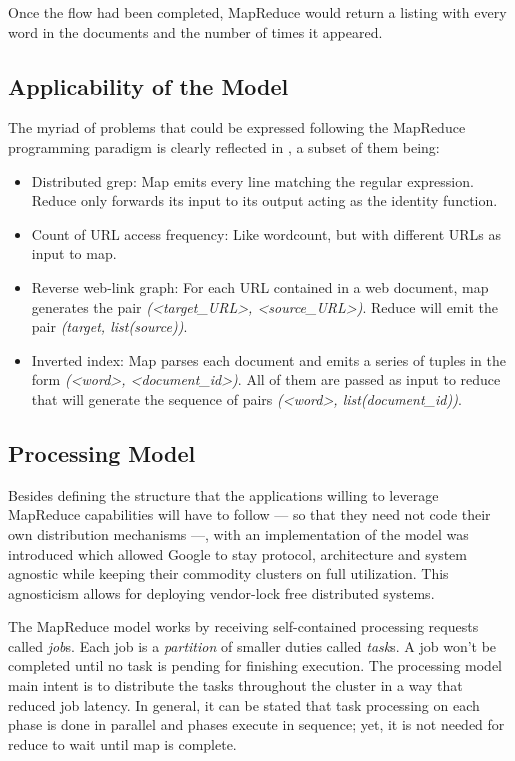 Once the flow had been completed, MapReduce would return a listing with every word in the documents and the number of times it appeared.

\subsection{Applicability of the Model}\label{subsec:aplicabilidad}
\noindent The myriad of problems that could be expressed following the MapReduce programming paradigm is clearly reflected in \cite{googlemapreduce}, a subset of them being:

\begin{itemize}
 \item Distributed grep: Map emits every line matching the regular expression. Reduce only forwards its input to its output acting as the identity function.
 \item Count of URL access frequency: Like wordcount, but with different URLs as input to map.
 \item Reverse web-link graph: For each URL contained in a web document, map generates the pair \emph{(<target\_URL>, <source\_URL>)}. Reduce will emit the pair \emph{(target, list(source))}.
 \item Inverted index: Map parses each document and emits a series of tuples in the form \emph{(<word>, <document\_id>)}. All of them are passed as input to reduce that will generate the sequence of pairs \emph{(<word>, list(document\_id))}.
\end{itemize}

\subsection{Processing Model}\label{subsec:processingmodel}
\noindent Besides defining the structure that the applications willing to leverage MapReduce capabilities will have to follow --- so that they need not code their own distribution mechanisms ---, with \cite{googlemapreduce} an implementation of the model was introduced which allowed Google to stay protocol, architecture and system agnostic while keeping their commodity clusters on full utilization. This agnosticism allows for deploying vendor-lock free distributed systems.

The MapReduce model works by receiving self-contained processing requests called \emph{job}s. Each job is a \emph{partition} of smaller duties called \emph{task}s. A job won't be completed until no task is pending for finishing execution. The processing model main intent is to distribute the tasks throughout the cluster in a way that reduced job latency. In general, it can be stated that task processing on each phase is done in parallel and phases execute in sequence; yet, it is not needed for reduce to wait until map is complete.

